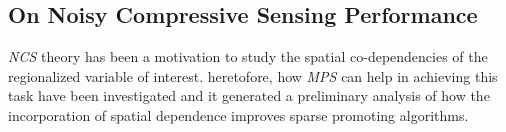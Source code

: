 













\subsection{On Noisy Compressive Sensing Performance}
\label{sec_exp_NCS_APP}


\emph{NCS} theory has been a motivation to study the spatial co-dependencies of the regionalized variable of interest. heretofore, how \emph{MPS} can help in achieving this task have been investigated and it generated a preliminary analysis of how the incorporation of spatial dependence improves sparse promoting algorithms.

